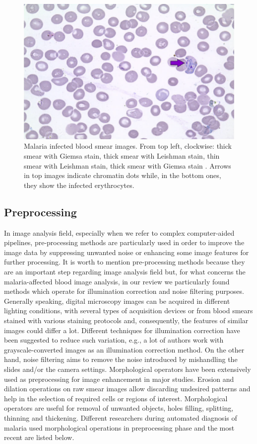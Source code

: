 \documentclass[sensors,review,submit,moreauthors,pdftex,10pt,a4paper]{mdpi}
\begin{document}
\begin{figure}[!t]
		\includegraphics[height=0.15\textheight]{img/f3_ThinLeishman}
		\caption{\label{fig:thick_thin_film}Malaria infected blood smear images. From top left, clockwise: thick smear with Giemsa stain, thick smear with Leishman stain, thin smear with Leishman stain, thick smear with Giemsa stain \cite{Das2015}. Arrows in top images indicate chromatin dots while, in the bottom ones, they show the infected erythrocytes.}
	\end{figure}
	
	\subsection{Preprocessing}
	In image analysis field, especially when we refer to complex computer-aided pipelines, pre-processing methods are particularly used in order to improve the image data by suppressing unwanted noise or enhancing some image features for further processing.
	It is worth to mention pre-processing methods because they are an important step regarding image analysis field but, for what concerns the malaria-affected blood image analysis, in our review we particularly found methods which operate for illumination correction and noise filtering purposes.
	Generally speaking, digital microscopy images can be acquired in different lighting conditions, with several types of acquisition devices or from blood smears stained with various staining protocols and, consequently, the features of similar images could differ a lot.
	Different techniques for illumination correction have been suggested to reduce such variation, e.g., a lot of authors work with grayscale-converted images as an illumination correction method.
	On the other hand, noise filtering aims to remove the noise introduced by mishandling the slides and/or the camera settings.
	Morphological operators have been extensively used as preprocessing for image enhancement in major studies.
	Erosion and dilation operations on raw smear images allow discarding undesired patterns and help in the selection of required cells or regions of interest. Morphological operators are useful for removal of unwanted
	objects, holes filling, splitting, thinning and thickening. Different researchers during automated diagnosis of malaria used morphological operations in preprocessing phase and the most recent are listed below.
	
\end{document}
